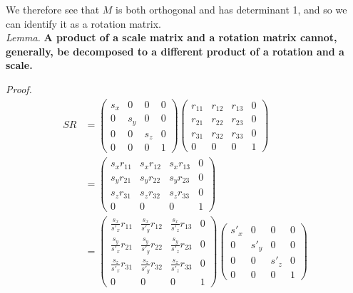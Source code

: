 \documentclass{article}
\begin{document}
We therefore see that $M$ is both orthogonal and has determinant 1, and so we can identify it as a rotation matrix.\\

\noindent
\textit{Lemma.}\textbf{ A product of a scale matrix and a rotation matrix cannot, generally, be decomposed to a different product of a rotation and a scale.}

\noindent\textit{Proof.}
\begin{align}
S R &= \begin{pmatrix}
s_x & 0 & 0 & 0\\
0 & s_y & 0 & 0\\
0 & 0 & s_z & 0\\
0 & 0 & 0 & 1
\end{pmatrix}
\begin{pmatrix}
r_{11} & r_{12} & r_{13} & 0\\
r_{21} & r_{22} & r_{23} & 0\\
r_{31} & r_{32} & r_{33} & 0\\
0 & 0 & 0 & 1
\end{pmatrix}\\
&= \begin{pmatrix}
s_x r_{11} & s_x r_{12} & s_x r_{13} & 0\\
s_y r_{21} & s_y r_{22} & s_y r_{23} & 0\\
s_z r_{31} & s_z r_{32} & s_z r_{33} & 0\\
0 & 0 & 0 & 1
\end{pmatrix}\\
&= \begin{pmatrix}
\frac{s_x}{s'_x} r_{11} & \frac{s_x}{s'_y} r_{12} & \frac{s_x}{s'_z} r_{13} & 0\\
\frac{s_y}{s'_x} r_{21} & \frac{s_y}{s'_y} r_{22} & \frac{s_y}{s'_z} r_{23} & 0\\
\frac{s_z}{s'_x} r_{31} & \frac{s_z}{s'_y} r_{32} & \frac{s_z}{s'_z} r_{33} & 0\\
0 & 0 & 0 & 1
\end{pmatrix}
\begin{pmatrix}
s'_x & 0 & 0 & 0\\
0 & s'_y & 0 & 0\\
0 & 0 & s'_z & 0\\
0 & 0 & 0 & 1
\end{pmatrix}
\end{align}

\iffalse
\end{document}
